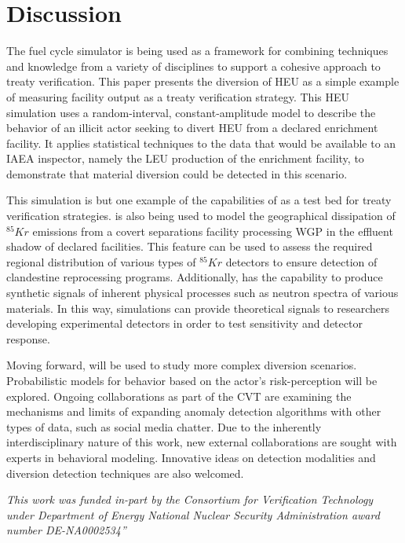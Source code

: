 \section{Discussion}
\label{s_dis}






The \Cyclus fuel cycle simulator is being used as a framework for combining techniques and knowledge from a variety of disciplines to support a cohesive approach to treaty verification. This paper presents the diversion of \gls{HEU} as a simple example of measuring facility output as a treaty verification strategy.  This \gls{HEU} simulation uses a random-interval, constant-amplitude model to describe the behavior of an illicit actor seeking to divert \gls{HEU} from a declared enrichment facility.  It applies statistical techniques to the data that would be available to an \gls{IAEA} inspector, namely the \gls{LEU} production of the enrichment facility, to demonstrate that material diversion could be detected in this scenario.

This simulation is but one example of the capabilities of \Cyclus as a test bed for treaty verification strategies.  \Cyclus is also being used to model the geographical dissipation of $^{85}Kr$ emissions from a covert separations facility processing \gls{WGP} in the effluent shadow of declared facilities.  This feature can be used to assess the required regional distribution of various types of $^{85}Kr$ detectors to ensure detection of clandestine reprocessing programs.  Additionally, \Cyclus has the capability to produce synthetic signals of inherent physical processes such as neutron spectra of various materials.  In this way, \Cyclus simulations can provide theoretical signals to researchers developing experimental detectors in order to test sensitivity and detector response.

Moving forward, \Cyclus will be used to study more complex diversion scenarios.  Probabilistic models for behavior based on the actor's risk-perception will be explored.  Ongoing collaborations as part of the \gls{CVT} are examining the mechanisms and limits of expanding anomaly detection algorithms with other types of data, such as social media chatter.  Due to the inherently interdisciplinary nature of this work, new external collaborations are sought with experts in behavioral modeling. Innovative ideas on detection modalities and diversion detection techniques are also welcomed.



\textit{This work was funded in-part by the Consortium for Verification Technology under Department of Energy National Nuclear Security Administration award number DE-NA0002534”}
